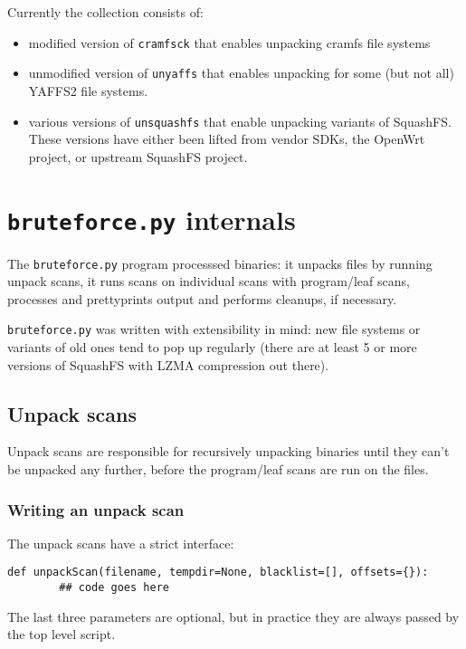 \documentclass[10pt]{article}
\begin{document}
Currently the collection consists of:

\begin{itemize}
\item modified version of \texttt{cramfsck} that enables unpacking cramfs
file systems
\item unmodified version of \texttt{unyaffs} that enables unpacking for some
(but not all) YAFFS2 file systems.
\item various versions of \texttt{unsquashfs} that enable unpacking variants
of SquashFS. These versions have either been lifted from vendor SDKs, the
OpenWrt project, or upstream SquashFS project.
\end{itemize}

\appendix

\section{\texttt{bruteforce.py} internals}

The \texttt{bruteforce.py} program processsed binaries: it unpacks files by
running unpack scans, it runs scans on individual scans with program/leaf
scans, processes and prettyprints output and performs cleanups, if necessary.

\texttt{bruteforce.py} was written with extensibility in mind: new file systems
or variants of old ones tend to pop up regularly (there are at least 5 or more
versions of SquashFS with LZMA compression out there).

\subsection{Unpack scans}

Unpack scans are responsible for recursively unpacking binaries until they
can't be unpacked any further, before the program/leaf scans are run on the
files.

\subsubsection{Writing an unpack scan}

The unpack scans have a strict interface:

\begin{verbatim}
def unpackScan(filename, tempdir=None, blacklist=[], offsets={}):
        ## code goes here
\end{verbatim}

The last three parameters are optional, but in practice they are always passed
by the top level script.
\end{document}
